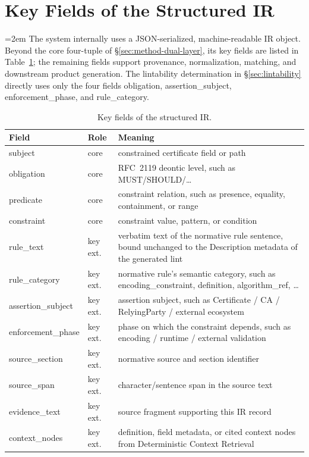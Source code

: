\section{Key Fields of the Structured IR}
\label{app:ir}

\begingroup\emergencystretch=2em\relax
The system internally uses a JSON-serialized, machine-readable IR object.
Beyond the core four-tuple of \S\ref{sec:method-dual-layer}, its key fields are listed in Table~\ref{tab:irfields};
the remaining fields support provenance, normalization, matching, and downstream
product generation. The lintability determination in \S\ref{sec:lintability} directly
uses only the four fields obligation, assertion\_subject, enforcement\_phase, and
rule\_category.
\par\endgroup


\begin{table}[!htbp]
\centering
\footnotesize
\caption{Key fields of the structured IR.}
\label{tab:irfields}
\begin{tabularx}{\columnwidth}{@{}l l X@{}}
\toprule
Field & Role & Meaning \\
\midrule
subject & core & constrained certificate field or path \\
obligation & core & RFC~2119 deontic level, such as MUST/SHOULD/\dots \\
predicate & core & constraint relation, such as presence, equality,
  containment, or range \\
constraint & core & constraint value, pattern, or condition \\
rule\_text & key ext. & verbatim text of the normative rule sentence, bound
  unchanged to the Description metadata of the generated lint \\
rule\_category & key ext. & normative rule's semantic category, such as
  encoding\_constraint, definition, algorithm\_ref, \dots \\
assertion\_subject & key ext. & assertion subject, such as Certificate / CA /
  RelyingParty / external ecosystem \\
enforcement\_phase & key ext. & phase on which the constraint depends,
  such as encoding / runtime / external validation \\
source\_section & key ext. & normative source and section
  identifier \\
source\_span & key ext. & character/sentence span in the source text \\
evidence\_text & key ext. & source fragment supporting this IR record \\
context\_nodes & key ext. & definition, field metadata, or cited
  context nodes from Deterministic Context Retrieval \\
\bottomrule
\end{tabularx}
\end{table}


